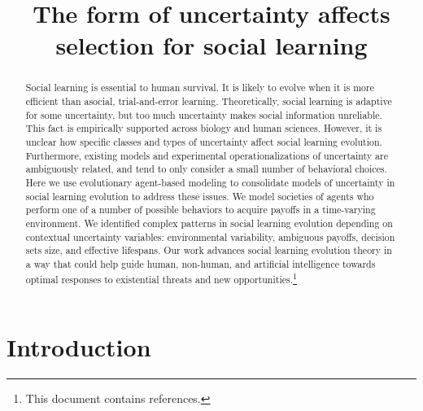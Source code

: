 \documentclass[letterpaper,11.5pt]{scrartcl}
\title{The form of uncertainty affects selection for social learning}
\author{{}}
\begin{document}
\maketitle

\newcommand{\pisub}[1]{\pi_{\mathrm{#1}}}
\newcommand{\pilow}{\pisub{low}}
\newcommand{\pihigh}{\pisub{high}}
\newcommand{\piI}{\langle \pisub{I} \rangle}
\newcommand{\piS}{\langle \pisub{S} \rangle}
\newcommand{\ledger}{\bar\pi_{ib}}

\newcommand{\meanvar}[1]{\langle #1 \rangle}
\newcommand{\meansl}{\meanvar{s}}
\newcommand{\meanpi}{\meanvar{\pi}}
\newcommand{\meansoc}{\meanvar{\pi_\mathrm{S}}}
\newcommand{\meanasoc}{\meanvar{\pi_\mathrm{A}}}
\newcommand{\meanT}{\meanvar{T}}

\newcommand{\bandit}{\text{Bandit}_b(0, 1)}

\begin{abstract}

Social learning is essential to human survival. It is likely to evolve when it is more
efficient than asocial, trial-and-error learning. Theoretically, social learning
is adaptive for some uncertainty, but too much uncertainty makes
social information unreliable. This fact is empirically
supported across biology and human sciences. However, it is unclear how
specific classes and types of uncertainty affect social
learning evolution. Furthermore, existing models and experimental operationalizations of
uncertainty are ambiguously related, and 
tend to only consider a small number of behavioral
choices.  Here we use evolutionary agent-based modeling to consolidate
models of uncertainty in social learning evolution to address these issues.
We model societies of agents who perform one of a number
of possible behaviors to acquire payoffs in a time-varying environment.
We identified complex patterns in social learning evolution depending on contextual
uncertainty variables: environmental variability, ambiguous payoffs, 
decision sets size, and effective lifespans. 
Our work advances social learning evolution theory in a way that could help 
guide human, non-human, and artificial intelligence towards optimal responses 
to existential threats and new opportunities.\footnote{This document contains
 references.}  
\end{abstract}


\section{Introduction}
\end{document}
